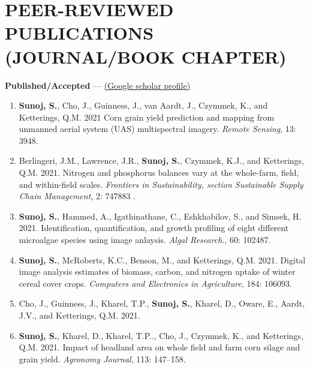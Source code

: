 \documentclass[11pt]{article}
\begin{document}
\section*{PEER-REVIEWED PUBLICATIONS (JOURNAL/BOOK CHAPTER)}
\textbf{Published/Accepted} --- \href{https://scholar.google.com/citations?user=PSu2s7YAAAAJ&hl=en}{(Google scholar profile)}\\
\begin{enumerate} [itemsep=-0.5ex]

\item \textbf{Sunoj, S.}, Cho, J., Guinness, J., van Aardt, J., Czymmek, K., and Ketterings, Q.M. 2021 Corn grain yield prediction and mapping from unmanned aerial system (UAS) multispectral imagery. \textit{Remote Sensing}, 13: 3948.

\item Berlingeri, J.M., Lawrence, J.R., \textbf{Sunoj, S.}, Czymmek, K.J., and Ketterings, Q.M. 2021. Nitrogen and phosphorus balances vary at the whole-farm, field, and within-field scales. \textit{Frontiers in Sustainability, section Sustainable Supply Chain Management}, 2: 747883 .

\item \textbf{Sunoj, S.}, Hammed, A., Igathinathane, C., Eshkhabilov, S., and Simsek, H. 2021. Identification, quantification, and growth profiling of eight different microalgae species using image anlaysis. \textit{Algal Research}., 60: 102487.

\item \textbf{Sunoj, S.}, McRoberts, K.C., Benson, M., and Ketterings, Q.M. 2021. Digital image analysis estimates of biomass, carbon, and nitrogen uptake of winter cereal cover crops. \textit{Computers and Electronics in Agriculture}, 184: 106093.
	
\item Cho, J., Guinness, J., Kharel, T.{P}., \textbf{Sunoj, S.}, Kharel, D., Oware, E., Aardt, J.V., and Ketterings, Q.M. 2021. 

\item \textbf{Sunoj, S.}, Kharel, D., Kharel, T.{P}.., Cho, J., Czymmek, K., and Ketterings, Q.M. 2021. Impact of headland area on whole field and farm corn silage and grain yield. \textit{Agronomy Journal}, 113: 147--158. 


\end{enumerate}
\end{document}
